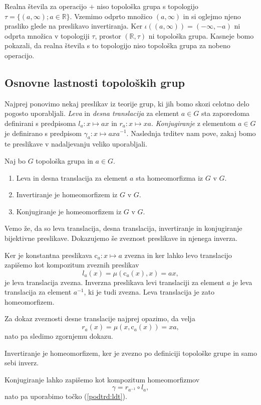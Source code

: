 \documentclass[mat1]{fmfdelo}
\newcommand{\R}{\mathbb R}
\begin{document}
\begin{primer}\label{pri:haus}
	Realna števila za operacijo $+$ niso topološka grupa s topologijo $\tau = \lbrace (a, \infty) ; a \in \R \rbrace$. Vzemimo odprto množico $(a, \infty)$ in si oglejmo njeno prasliko glede na preslikavo invertiranja. Ker $\iota((a, \infty)) = (-\infty, -a)$ ni odprta množica v topologiji $\tau$, prostor $(\R, \tau)$ ni topološka grupa. Kasneje bomo pokazali, da realna števila s to topologijo niso topološka grupa za nobeno operacijo.
\end{primer}

\subsection{Osnovne lastnosti topoloških grup}
Najprej ponovimo nekaj preslikav iz teorije grup, ki jih bomo skozi celotno delo pogosto uporabljali. \emph{Leva} in \emph{desna translacija} za element $a \in G$ sta zaporedoma definirani s predpisoma $l_a\colon x \mapsto ax$ in $r_a\colon x \mapsto xa$. \emph{Konjugiranje} z elementom $a \in G$ je definirano s predpisom $\gamma_a\colon x \mapsto axa^{-1}$. Naslednja trditev nam pove, zakaj bomo te preslikave v nadaljevanju veliko uporabljali.

\begin{trditev}\label{trd:trans}
Naj bo $G$ topološka grupa in $a \in G$.
\begin{enumerate}
\item Leva in desna translacija za element $a$ sta homeomorfizma iz $G$ v $G$.\label{podtrd:ldt}
\item Invertiranje je homeomorfizem iz $G$ v $G$.
\item Konjugiranje je homeomorfizem iz $G$ v $G$.
\end{enumerate}
\end{trditev}

\begin{dokaz}
Vemo že, da so leva translacija, desna translacija, invertiranje in konjugiranje bijektivne preslikave. Dokazujemo še zveznost pre\-sli\-ka\-ve in njenega inverza.

Ker je konstantna preslikava $\text{c}_a\colon x \mapsto a$ zvezna in ker
lahko levo translacijo zapišemo kot kompozitum zveznih preslikav \[l_a(x) = \mu(\text{c}_a(x), x) = ax,\]
je leva translacija zvezna. Inverzna preslikava levi translaciji za element $a$ je leva translacija za element $a^{-1}$, ki je tudi zvezna. Leva translacija je zato homeomorfizem.

Za dokaz zveznosti desne translacije najprej opazimo, da velja
\[r_a(x) = \mu(x, \text{c}_a(x)) = xa,\]
nato pa sledimo zgornjemu dokazu.

Invertiranje je homeomorfizem, ker je zvezno po definiciji topološke grupe in samo sebi inverz.

Konjugiranje lahko zapišemo kot kompozitum homeomorfizmov \[\gamma = r_{a^{-1}} \circ l_a,\]
nato pa uporabimo točko (\ref{podtrd:ldt}).
\end{dokaz}
\end{document}
